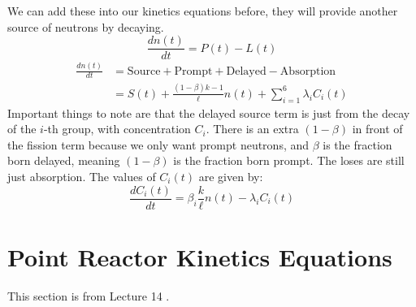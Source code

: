\documentclass[letter]{article}
\begin{document}
We can add these into our kinetics equations before, they will provide
another source of neutrons by decaying.
\begin{equation*}
  \frac{dn(t)}{dt}=P(t)-L(t)
\end{equation*}
\begin{equation*}
  \begin{split}
    \frac{dn(t)}{dt} &= \text{Source} + \text{Prompt} + \text{Delayed}
    - \text{Absorption}\\
    &= S(t) + \frac{(1-\beta)k-1}{\ell}n(t)+\sum^6_{i=1}\lambda_iC_i(t)
  \end{split}
\end{equation*}
Important things to note are that the delayed source term is just from
the decay of the $i$-th group, with concentration $C_i$. There is an
extra $(1-\beta)$ in front of the fission term because we only want
prompt neutrons, and $\beta$ is the fraction born delayed, meaning
$(1-\beta)$ is the fraction born prompt. The loses are still just
absorption. The values of $C_i(t)$ are given by:
\begin{equation*}
  \frac{dC_i(t)}{dt}=\beta_i\frac{k}{\ell}n(t)-\lambda_iC_i(t)
\end{equation*}

\section{Point Reactor Kinetics Equations}

This section is from Lecture 14 \cite{lecture}.
\end{document}
